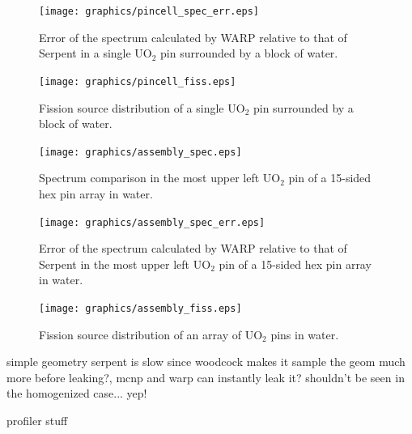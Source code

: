 \begin{figure}[h!] 
\centering
\texttt{[image: graphics/pincell\_spec\_err.eps]}
\caption{Error of the spectrum calculated by WARP relative to that of Serpent in a single UO$_2$ pin surrounded by a block of water. \label{pincell_spec_err} }
\end{figure}

\begin{figure}[h!] 
\centering
\texttt{[image: graphics/pincell\_fiss.eps]}
\caption{Fission source distribution of a single UO$_2$ pin surrounded by a block of water. \label{pincell_fiss} }
\end{figure}

\begin{figure}[h!] 
\centering
\texttt{[image: graphics/assembly\_spec.eps]}
\caption{Spectrum comparison in the most upper left UO$_2$ pin of a 15-sided hex pin array in water. \label{assembly_spec} }
\end{figure}

\begin{figure}[h!] 
\centering
\texttt{[image: graphics/assembly\_spec\_err.eps]}
\caption{Error of the spectrum calculated by WARP relative to that of Serpent in the most upper left UO$_2$ pin of a 15-sided hex pin array in water. \label{assembly_spec_err} }
\end{figure}

\begin{figure}[h!] 
\centering
\texttt{[image: graphics/assembly\_fiss.eps]}
\caption{Fission source distribution of an array of UO$_2$ pins in water. \label{assembly_fiss} }
\end{figure}

simple geometry serpent is slow since woodcock makes it sample the geom much more before leaking?, mcnp and warp can instantly leak it?  shouldn't be seen in the homogenized case... yep!


profiler stuff

